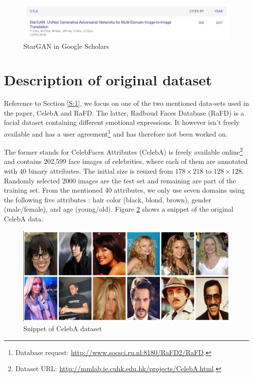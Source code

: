 \documentclass[preprint,12pt]{elsarticle}
\begin{document}
\begin{figure}[ht]
\centering\includegraphics[width=1.0\linewidth]{citation.png}
\caption{StarGAN in Google Scholars}
\label{fig:cite}
\end{figure}

\section{Description of original dataset}
\label{S:2}

Reference to Section \ref{S:1}, we focus on one of the two mentioned data-sets used in the paper, CelebA and RaFD. The latter, Radboud Faces Database (RaFD)\cite{RaFDdataset} is a facial dataset containing different emotional expressions. It however isn't freely available and has a user agreement\footnote{Database request: \url{http://www.socsci.ru.nl:8180/RaFD2/RaFD}.} and has therefore not been worked on. 

The former stands for CelebFaces Attributes (CelebA)\cite{liu2015faceattributes} is freely available online\footnote{Dataset URL: \url{http://mmlab.ie.cuhk.edu.hk/projects/CelebA.html}.} and contains 202,599 face images of celebrities, where each of them are annotated with 40 binary attributes. The initial size is resized from $178\times218$ to $128\times128$. Randomly selected 2000 images are the test set and remaining are part of the training set. From the mentioned 40 attributes, we only use seven domains using the following five attributes : hair color (black, blond, brown), gender (male/female), and age (young/old). Figure \ref{fig:CelebA} shows a snippet of the original CelebA data. 

\begin{figure}[ht]
\centering\includegraphics[width=0.7\linewidth]{CelebA.png}
\caption{Snippet of CelebA dataset}
\label{fig:CelebA}
\end{figure}
\end{document}

